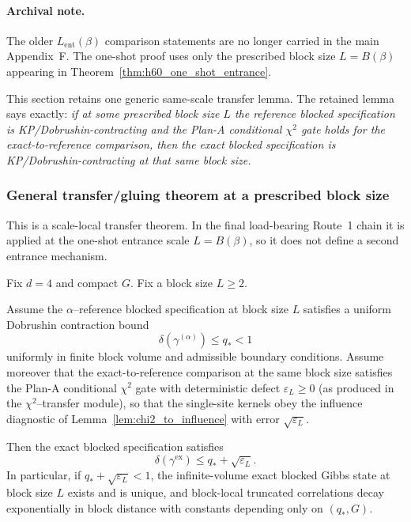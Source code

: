 \paragraph{Archival note.}
The older $L_{\mathrm{ent}}(\beta)$ comparison statements are no longer carried in the main Appendix~F.
The one-shot proof uses only the prescribed block size $L=B(\beta)$ appearing in Theorem~\ref{thm:h60_one_shot_entrance}.

This section retains one generic same-scale transfer lemma. The retained lemma says exactly: \emph{if at some prescribed block size $L$ the reference blocked specification is KP/Dobrushin-contracting and the Plan-A conditional $\chi^2$ gate holds for the exact-to-reference comparison, then the exact blocked specification is KP/Dobrushin-contracting at that same block size.}

\subsubsection{General transfer/gluing theorem at a prescribed block size}

This is a scale-local transfer theorem.
In the final load-bearing Route~1 chain it is applied at the one-shot entrance scale $L=B(\beta)$, so it does not define a second entrance mechanism.

\begin{theorem}\label{thm:gluing_KP_entrance}
Fix $d=4$ and compact $G$. Fix a block size $L\ge 2$.

Assume the $\alpha$--reference blocked specification at block size $L$ satisfies a uniform Dobrushin contraction bound
\[
\delta(\gamma^{(\alpha)})\le q_*<1
\]
uniformly in finite block volume and admissible boundary conditions.
Assume moreover that the exact-to-reference comparison at the same block size satisfies the Plan-A conditional $\chi^2$ gate
with deterministic defect $\varepsilon_L\ge 0$ (as produced in the $\chi^2$--transfer module), so that the single-site kernels obey
the influence diagnostic of Lemma~\ref{lem:chi2_to_influence} with error $\sqrt{\varepsilon_L}$.

Then the exact blocked specification satisfies
\[
\delta(\gamma^{\mathrm{ex}})\le q_*+\sqrt{\varepsilon_L}.
\]
In particular, if $q_*+\sqrt{\varepsilon_L}<1$, the infinite-volume exact blocked Gibbs state at block size $L$ exists and is unique, and
block-local truncated correlations decay exponentially in block distance with constants depending only on $(q_*,G)$.
\end{theorem}

